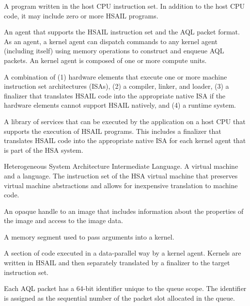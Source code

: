\documentclass[final,oneside]{book}
\begin{document}
\begin{description}[itemsep=5pt,leftmargin=0cm, labelindent=0cm]
\item[HSA application] A program written in the host CPU instruction set. In
  addition to the host CPU code, it may include zero or more HSAIL programs.

\item[kernel agent] An agent that supports the HSAIL instruction set and the
  AQL packet format. As an agent, a kernel agent can dispatch commands to
  any kernel agent (including itself) using memory operations to construct and
  enqueue AQL packets. An kernel agent is composed of one or more compute units.

\item[HSA implementation] A combination of (1) hardware elements that execute
  one or more machine instruction set architectures (ISAs), (2) a compiler,
  linker, and loader, (3) a finalizer that translates HSAIL code into the
  appropriate native ISA if the hardware elements cannot support HSAIL
  natively, and (4) a runtime system.

\item[HSA runtime] A library of services that can be executed by the application
  on a host CPU that supports the execution of HSAIL programs. This includes a
  finalizer that translates HSAIL code into the appropriate native ISA for each
  kernel agent that is part of the HSA system.

\item[HSAIL] Heterogeneous System Architecture Intermediate Language. A virtual
  machine and a language. The instruction set of the HSA virtual machine that
  preserves virtual machine abstractions and allows for inexpensive translation
  to machine code.

\item[Image handle] An opaque handle to an image that includes information about
  the properties of the image and access to the image data.

\item[Kernarg segment] A memory segment used to pass arguments into a kernel.

\item[Kernel] A section of code executed in a data-parallel way by a kernel
  agent. Kernels are written in HSAIL and then separately translated by a
  finalizer to the target instruction set.

\item[Packet ID] Each AQL packet has a 64-bit identifier unique to the queue
  scope. The identifier is assigned as the sequential number of the packet slot
  allocated in the queue.


\end{description}
\end{document}
